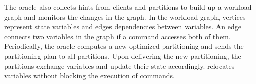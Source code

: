 The oracle also collects hints from clients and partitions to build up a
workload graph and monitors the changes in the graph.
In the workload graph, vertices represent state variables and edges dependencies
between variables. An edge connects two variables in the graph if a command
accesses both of them.
Periodically, the oracle computes a new optimized partitioning and sends the
partitioning plan to all partitions. Upon delivering the new partitioning, the
partitions exchange variables and update their state accordingly. \dynastar
relocates variables without blocking the execution of commands.

